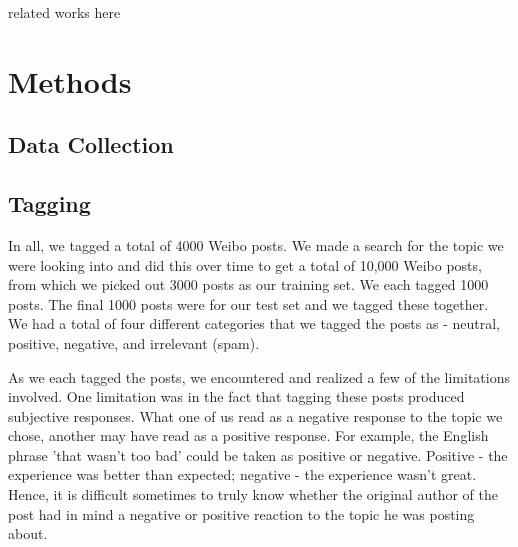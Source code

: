 \documentclass[11pt]{article}
\newcommand{\1}[1]{{\mathbf 1}\left\{#1\right\}}        %
\begin{document}
related works here 
\section{Methods}



\subsection{Data Collection}




\subsection{Tagging}


In all, we tagged a total of 4000 Weibo posts.  We made a search for the topic we were looking into and did this over time to get a total of 10,000 Weibo posts, from which we picked out 3000 posts as our training set.  We each tagged 1000 posts.  The final 1000 posts were for our test set and we tagged these together. We had a total of four different categories that we tagged the posts as - neutral, positive, negative, and irrelevant (spam).  

As we each tagged the posts, we encountered and realized a few of the limitations involved. One limitation was in the fact that tagging these posts produced subjective responses.  What one of us read as a negative response to the topic we chose, another may have read as a positive response.  For example, the English phrase 'that wasn't too bad' could be taken as positive or negative.  Positive - the experience was better than expected; negative - the experience wasn't great. Hence, it is difficult sometimes to truly know whether the original author of the post had in mind a negative or positive reaction to the topic he was posting about.  
\end{document}
